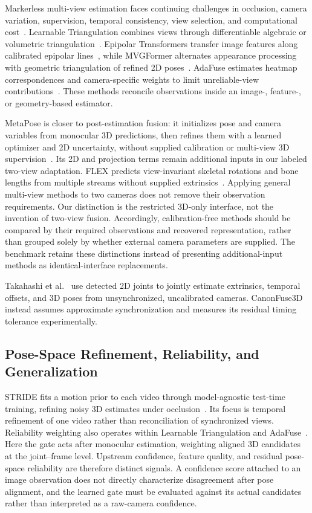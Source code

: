 \documentclass[preprint,12pt]{elsarticle}
\begin{document}
Markerless multi-view estimation faces continuing challenges in occlusion, camera variation, supervision, temporal consistency, view selection, and computational cost~\cite{nogueira2025survey}. Learnable Triangulation combines views through differentiable algebraic or volumetric triangulation~\cite{iskakov2019learnable}. Epipolar Transformers transfer image features along calibrated epipolar lines~\cite{he2020epipolar}, while MVGFormer alternates appearance processing with geometric triangulation of refined 2D poses~\cite{liao2024multiple}. AdaFuse estimates heatmap correspondences and camera-specific weights to limit unreliable-view contributions~\cite{zhang2021adafuse}. These methods reconcile observations inside an image-, feature-, or geometry-based estimator.

MetaPose is closer to post-estimation fusion: it initializes pose and camera variables from monocular 3D predictions, then refines them with a learned optimizer and 2D uncertainty, without supplied calibration or multi-view 3D supervision~\cite{usman2022metapose}. Its 2D and projection terms remain additional inputs in our labeled two-view adaptation. FLEX predicts view-invariant skeletal rotations and bone lengths from multiple streams without supplied extrinsics~\cite{gordon2022flex}. Applying general multi-view methods to two cameras does not remove their observation requirements. Our distinction is the restricted 3D-only interface, not the invention of two-view fusion. Accordingly, calibration-free methods should be compared by their required observations and recovered representation, rather than grouped solely by whether external camera parameters are supplied. The benchmark retains these distinctions instead of presenting additional-input methods as identical-interface replacements.

Takahashi et al.~\cite{takahashi2018human} use detected 2D joints to jointly estimate extrinsics, temporal offsets, and 3D poses from unsynchronized, uncalibrated cameras. CanonFuse3D instead assumes approximate synchronization and measures its residual timing tolerance experimentally.

\subsection{Pose-Space Refinement, Reliability, and Generalization}
STRIDE fits a motion prior to each video through model-agnostic test-time training, refining noisy 3D estimates under occlusion~\cite{lal2025stride}. Its focus is temporal refinement of one video rather than reconciliation of synchronized views. Reliability weighting also operates within Learnable Triangulation and AdaFuse~\cite{iskakov2019learnable,zhang2021adafuse}. Here the gate acts after monocular estimation, weighting aligned 3D candidates at the joint--frame level. Upstream confidence, feature quality, and residual pose-space reliability are therefore distinct signals. A confidence score attached to an image observation does not directly characterize disagreement after pose alignment, and the learned gate must be evaluated against its actual candidates rather than interpreted as a raw-camera confidence.
\end{document}
